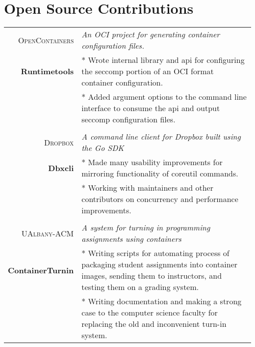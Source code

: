\documentclass[a4paper,10pt]{article}
\begin{document}
\section{Open Source Contributions}
\begin{tabular}{rp{11cm}}

\textsc{OpenContainers}&
\textit{An OCI project for generating container configuration files.} \\
\textbf{Runtimetools}

&\footnotesize{* Wrote internal library and api for configuring the seccomp portion of an OCI format container configuration.}\\
&\footnotesize{* Added argument options to the command line interface to consume the api and output seccomp configuration files.}\\\\


\textsc{Dropbox}&
\textit{A command line client for Dropbox built using the Go SDK} \\
\textbf{Dbxcli}

&\footnotesize{* Made many usability improvements for mirroring functionality of coreutil commands.}\\
&\footnotesize{* Working with maintainers and other contributors on concurrency and performance improvements.}\\\\

\textsc{UAlbany-ACM}&
\textit{A system for turning in programming assignments using containers} \\
\textbf{ContainerTurnin}

&\footnotesize{* Writing scripts for automating process of packaging student assignments into container images, sending them to instructors, and testing them on a grading system.}\\
&\footnotesize{* Writing documentation and making a strong case to the computer science faculty for replacing the old and inconvenient turn-in system.}

\end{tabular}
\end{document}
